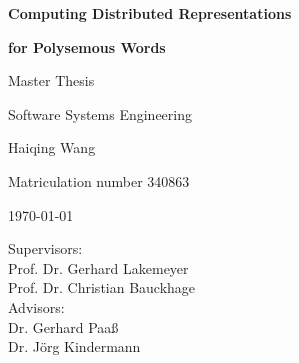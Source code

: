 \thispagestyle{empty}

\vspace*{3cm}
\centerline{{\Large\bf Computing Distributed Representations }}

\vspace*{4mm}

\centerline{{\Large\bf for Polysemous Words}}

\vspace{2cm}

\centerline{Master Thesis}
\centerline{Software Systems Engineering}

\vspace{2cm}

\centerline{{\large Haiqing Wang}}
\centerline{Matriculation number 340863}

\vspace{10mm}

\centerline{\today}

\vspace{10mm}

\begin{center}
\begin{minipage}[t]{8cm}
Supervisors: \\
\hspace*{2cm} Prof. Dr. Gerhard Lakemeyer \\
\hspace*{2cm} Prof. Dr. Christian Bauckhage\\[1cm]
Advisors: \\
\hspace*{2cm} Dr. Gerhard Paaß\\
\hspace*{2cm} Dr. Jörg Kindermann\\
\end{minipage}
\end{center}

